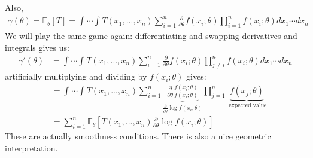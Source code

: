 \documentclass[11pt]{scrartcl}
\theoremstyle{definition}
\theoremstyle{remark}
\newcommand{\EXth}[1]{\mathbb{E}_\theta \left[ #1 \right]}
\newcommand{\idx}[2]{\int_{#1}^{#2}}
\begin{document}
Also, 
\begin{align*}
	\gamma ( \theta ) = \EXth{T} = \idx{}{} \cdots \idx{}{} T(x_1, ..., x_n) \sum_{i=1}^n \frac{\partial}{\partial \theta} f(x_i; \theta) \prod_{i=1}^n f(x_i; \theta) dx_1 \cdots d x_n 	
\end{align*}
We will play the same game again: differentiating and swapping derivatives and integrals gives us: 
\begin{align*}
		\gamma' ( \theta ) & =  \idx{}{} \cdots \idx{}{} T(x_1, ..., x_n) \sum_{i=1}^n \frac{\partial}{\partial \theta} f(x_i; \theta) \prod_{j \neq i}^n f(x_i; \theta) dx_1 \cdots d x_n	
\end{align*}
artificially multiplying and dividing by $f(x_i; \theta)$ gives: 
\begin{align*}
	& = \idx{}{} \cdots \idx{}{} T(x_1, ..., x_n ) \sum_{i=1}^n \underbrace{\frac{\partial}{\partial \theta} \frac{ f(x_i; \theta) 	}{f(x_i; \theta)}}_{\frac{\partial}{\partial \theta} \log f(x_i; \theta)} \prod_{j=1}^n \underbrace{f(x_j; \theta)}_{\text{ expected value}} \\
	& = \sum_{i=1}^n \EXth{T(x_1, ..., x_n) \frac{\partial}{\partial \theta} \log f(x_i; \theta) } 
\end{align*}
These are actually smoothness conditions. There is also a nice geometric interpretation. 
\end{document}

